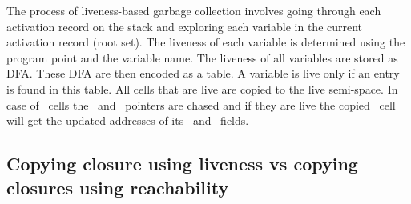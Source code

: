 \documentclass[9pt]{sigplanconf}
\newcommand{\comment}[1]{{\color{Myblue}{(#1)}}}
\begin{document}

The process of liveness-based garbage collection involves going through 
each activation record on the stack and exploring each variable in the 
current activation record (root set). The liveness of each variable is 
determined using the program point and the variable name. The liveness 
of all variables are stored as DFA. These DFA are then encoded as a 
table. A variable is live only if an entry is found in this table.
All cells that are live are copied to the live semi-space. In case of 
\CONS\ cells the \CAR\ and \CDR\ pointers are chased and if they are 
live the copied \CONS\ cell will get the updated addresses of its 
\CAR\ and \CDR\ fields.



\subsection{Copying closure using liveness vs copying closures using reachability}\label{sec:strategies}
\end{document}
